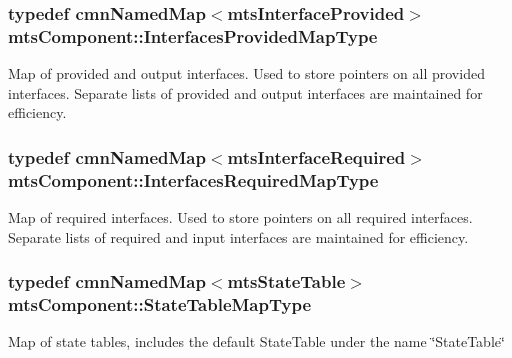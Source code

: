\subsubsection[{Interfaces\+Provided\+Map\+Type}]{\setlength{\rightskip}{0pt plus 5cm}typedef {\bf cmn\+Named\+Map}$<${\bf mts\+Interface\+Provided}$>$ {\bf mts\+Component\+::\+Interfaces\+Provided\+Map\+Type}\hspace{0.3cm}{\ttfamily [protected]}}\label{classmts_component_a1d4117bf122737abe5f943a7ce057ff6}
Map of provided and output interfaces. Used to store pointers on all provided interfaces. Separate lists of provided and output interfaces are maintained for efficiency. \hypertarget{classmts_component_aa3264a5cc739bccecbb58e5095bdd696}{}
\subsubsection[{Interfaces\+Required\+Map\+Type}]{\setlength{\rightskip}{0pt plus 5cm}typedef {\bf cmn\+Named\+Map}$<${\bf mts\+Interface\+Required}$>$ {\bf mts\+Component\+::\+Interfaces\+Required\+Map\+Type}\hspace{0.3cm}{\ttfamily [protected]}}\label{classmts_component_aa3264a5cc739bccecbb58e5095bdd696}
Map of required interfaces. Used to store pointers on all required interfaces. Separate lists of required and input interfaces are maintained for efficiency. \hypertarget{classmts_component_afd25509fe46d10ebc7a53347aa21c4ec}{}
\subsubsection[{State\+Table\+Map\+Type}]{\setlength{\rightskip}{0pt plus 5cm}typedef {\bf cmn\+Named\+Map}$<${\bf mts\+State\+Table}$>$ {\bf mts\+Component\+::\+State\+Table\+Map\+Type}\hspace{0.3cm}{\ttfamily [protected]}}\label{classmts_component_afd25509fe46d10ebc7a53347aa21c4ec}
Map of state tables, includes the default State\+Table under the name \char`\"{}\+State\+Table\char`\"{} \hypertarget{classmts_component_a938b0f369786119d9fa6426a2e3df112}{}
